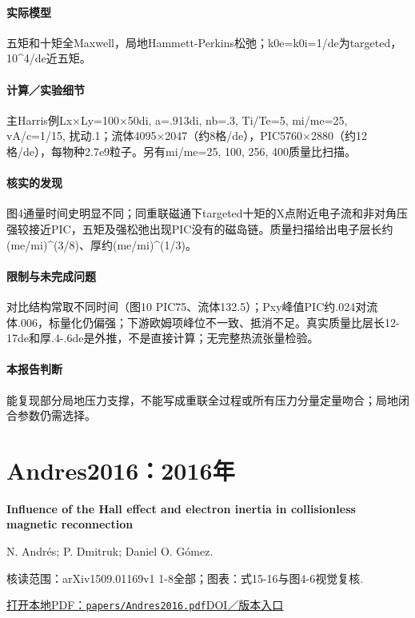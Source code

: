 \paragraph{实际模型}五矩和十矩全Maxwell，局地Hammett-Perkins松弛；k0e=k0i=1/de为targeted，10\textasciicircum{}4/de近五矩。

\paragraph{计算／实验细节}主Harris例Lx×Ly=100×50di, a=.913di, nb=.3, Ti/Te=5, mi/me=25, vA/c=1/15, 扰动.1；流体4095×2047（约8格/de），PIC5760×2880（约12格/de），每物种2.7e9粒子。另有mi/me=25, 100, 256, 400质量比扫描。

\paragraph{核实的发现}图4通量时间史明显不同；同重联磁通下targeted十矩的X点附近电子流和非对角压强较接近PIC，五矩及强松弛出现PIC没有的磁岛链。质量扫描给出电子层长约(me/mi)\textasciicircum{}(3/8)、厚约(me/mi)\textasciicircum{}(1/3)。

\paragraph{限制与未完成问题}对比结构常取不同时间（图10 PIC75、流体132.5）；Pxy峰值PIC约.024对流体.006，标量化仍偏强；下游欧姆项峰位不一致、抵消不足。真实质量比层长12-17de和厚.4-.6de是外推，不是直接计算；无完整热流张量检验。

\paragraph{本报告判断}能复现部分局地压力支撑，不能写成重联全过程或所有压力分量定量吻合；局地闭合参数仍需选择。

\section{Andres2016：2016年}\label{paper:Andres2016}

\textbf{Influence of the Hall effect and electron inertia in collisionless magnetic reconnection}\citep{Andres2016}\

N. Andrés;  P. Dmitruk;  Daniel O. Gómez.

\textsf{核读范围：}arXiv1509.01169v1 1-8全部；\textsf{图表：}式15-16与图4-6视觉复核.

\href{run:papers/Andres2016.pdf}{打开本地PDF：\texttt{papers/Andres2016.pdf}}\quad\href{https://doi.org/10.1063/1.4942418}{DOI／版本入口}

